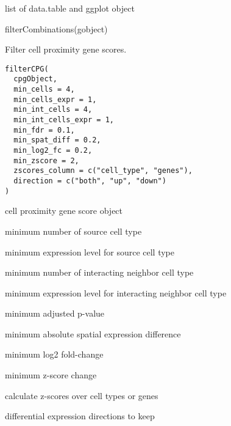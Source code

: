 \documentclass[a4paper]{book}
\begin{document}
%
\begin{Value}
list of data.table and ggplot object
\end{Value}
%
\begin{Examples}
\begin{ExampleCode}
    filterCombinations(gobject)
\end{ExampleCode}
\end{Examples}
%
\begin{Description}\relax
Filter cell proximity gene scores.
\end{Description}
%
\begin{Usage}
\begin{verbatim}
filterCPG(
  cpgObject,
  min_cells = 4,
  min_cells_expr = 1,
  min_int_cells = 4,
  min_int_cells_expr = 1,
  min_fdr = 0.1,
  min_spat_diff = 0.2,
  min_log2_fc = 0.2,
  min_zscore = 2,
  zscores_column = c("cell_type", "genes"),
  direction = c("both", "up", "down")
)
\end{verbatim}
\end{Usage}
%
\begin{Arguments}
\begin{ldescription}
\item[\code{cpgObject}] cell proximity gene score object

\item[\code{min\_cells}] minimum number of source cell type

\item[\code{min\_cells\_expr}] minimum expression level for source cell type

\item[\code{min\_int\_cells}] minimum number of interacting neighbor cell type

\item[\code{min\_int\_cells\_expr}] minimum expression level for interacting neighbor cell type

\item[\code{min\_fdr}] minimum adjusted p-value

\item[\code{min\_spat\_diff}] minimum absolute spatial expression difference

\item[\code{min\_log2\_fc}] minimum log2 fold-change

\item[\code{min\_zscore}] minimum z-score change

\item[\code{zscores\_column}] calculate z-scores over cell types or genes

\item[\code{direction}] differential expression directions to keep
\end{ldescription}
\end{Arguments}
\end{document}
